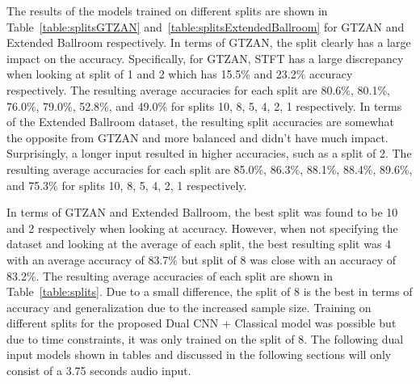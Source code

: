 \documentclass[10pt,twocolumn,letterpaper]{article}
\begin{document}
	The results of the models trained on different splits are shown in Table~\ref{table:splitsGTZAN} and~\ref{table:splitsExtendedBallroom} for GTZAN and Extended Ballroom respectively. In terms of GTZAN, the split clearly has a large impact on the accuracy. Specifically, for GTZAN, STFT has a large discrepancy when looking at split of 1 and 2 which has 15.5\% and 23.2\% accuracy respectively. The resulting average accuracies for each split are 80.6\%, 80.1\%, 76.0\%, 79.0\%, 52.8\%, and 49.0\% for splits 10, 8, 5, 4, 2, 1 respectively. In terms of the Extended Ballroom dataset, the resulting split accuracies are somewhat the opposite from GTZAN and more balanced and didn't have much impact. Surprisingly, a longer input resulted in higher accuracies, such as a split of 2. The resulting average accuracies for each split are 85.0\%, 86.3\%, 88.1\%, 88.4\%, 89.6\%, and 75.3\% for splits 10, 8, 5, 4, 2, 1 respectively.

	\begin{table}[!htbp] %
		\caption{Impact of Splits}
		\centering
		\label{table:splits}
	\end{table}

	In terms of GTZAN and Extended Ballroom, the best split was found to be 10 and 2 respectively when looking at accuracy. However, when not specifying the dataset and looking at the average of each split, the best resulting split was 4 with an average accuracy of 83.7\% but split of 8 was close with an accuracy of 83.2\%. The resulting average accuracies of each split are shown in Table~\ref{table:splits}. Due to a small difference, the split of 8 is the best in terms of accuracy and generalization due to the increased sample size. Training on different splits for the proposed Dual CNN + Classical model was possible but due to time constraints, it was only trained on the split of 8. The following dual input models shown in tables and discussed in the following sections will only consist of a 3.75 seconds audio input.
	
\end{document}
